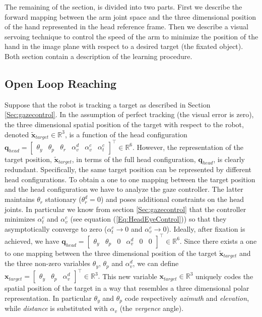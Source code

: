 The remaining of the section, is divided into two parts. First we describe the forward 
mapping between the arm joint space and the three 
dimensional position of the hand represented in the head reference 
frame. Then we describe a visual servoing technique to control the 
speed of the arm to minimize the position of the hand in the 
image plane with respect to a desired target (the fixated object).
Both section contain a description of the learning procedure.

\subsection{Open Loop Reaching} \label{sec:openReaching}
%
Suppose that the robot is tracking a target as described 
in Section \ref{Sec:gazecontrol}. In the assumption of perfect 
tracking (the visual error is zero), the three dimensional spatial position 
of the target with respect to the robot, denoted $\tilde {\mathbf x}_{target} 
\in \mathbb R^3$, 
is a function of the head configuration $\mathbf q_{head} =
\begin{bmatrix} \theta_y & \theta_p & \theta_r & \alpha_v^d & \alpha_v^c & \alpha_t^c \end{bmatrix}^\top \in \mathbb R^6$.
However, the representation of the target position, 
$\tilde {\mathbf x}_{target}$, in terms of the full head configuration, 
$\mathbf q_{head}$, is clearly redundant.
Specifically, the same target position can be represented by different 
head configurations. To obtain a one to one mapping between the target 
position and the head configuration we have to analyze the 
gaze controller. The latter maintains $\theta_r$ stationary 
($\theta_r^d = 0$) and poses additional constraints on the head joints. 
In particular we know from section \ref{Sec:gazecontrol} that the 
controller minimizes $\alpha_t^c$ and $\alpha^c_v$ (see equation 
(\ref{Eq:HeadEyeControl})) so that they asymptotically
converge to zero ($\alpha_t^c \rightarrow 0$ and 
$\alpha_v^c \rightarrow 0$). Ideally, after 
fixation is achieved, we have $
\mathbf {q}_{head}=
\begin{bmatrix} \theta_y & \theta_p & 0 & \alpha_v^d & 0 & 0 \end{bmatrix}^\top \in \mathbb R^6.
$
%
Since there exists a one to one mapping between the three dimensional 
position of the target 
$\tilde {\mathbf x}_{target}$ and the three non-zero variables 
$\theta_y$, $\theta_p$ and $\alpha_v^d$, we can define $
\mathbf x_{target}=
\begin{bmatrix} \theta_y & \theta_p & \alpha_v^d\end{bmatrix}^\top \in \mathbb R^3.
$
%
This new variable $\mathbf x_{target} \in \mathbb R^3$ uniquely codes the 
spatial position of the target in a way that resembles a three dimensional 
polar representation. In particular $\theta_y$ and $\theta_p$ code 
respectively \emph{azimuth} and \emph{elevation}, while \emph{distance} is 
substituted with $\alpha_v$ (the \emph{vergence} angle). 

